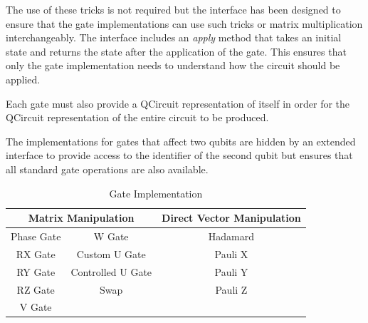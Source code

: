 The use of these tricks is not required but the interface has been designed to ensure that the gate implementations can use such tricks or matrix multiplication interchangeably.
The interface includes an \emph{apply} method that takes an initial state and returns the state after the application of the gate.
This ensures that only the gate implementation needs to understand how the circuit should be applied.

Each gate must also provide a QCircuit \cite{QCsite} representation of itself in order for the QCircuit representation of the entire circuit to be produced.

The implementations for gates that affect two qubits are hidden by an extended interface to provide access to the identifier of the second qubit but ensures that all standard gate operations are also available.

\begin{table}
\centering
\begin{tabular}{ | c | c || c | }
\hline
\multicolumn{2}{|c||}{\textbf{Matrix Manipulation}} & \textbf{Direct Vector Manipulation} \\ \hline
Phase Gate & W Gate &Hadamard \\ \hline
RX Gate &Custom U Gate & Pauli X \\ \hline
RY Gate &Controlled U Gate & Pauli Y \\ \hline
RZ Gate &Swap & Pauli Z \\ \hline
V Gate && \\ \hline
\end{tabular}
\caption{Gate Implementation}
\label{tab:gateimps}
\end{table}

